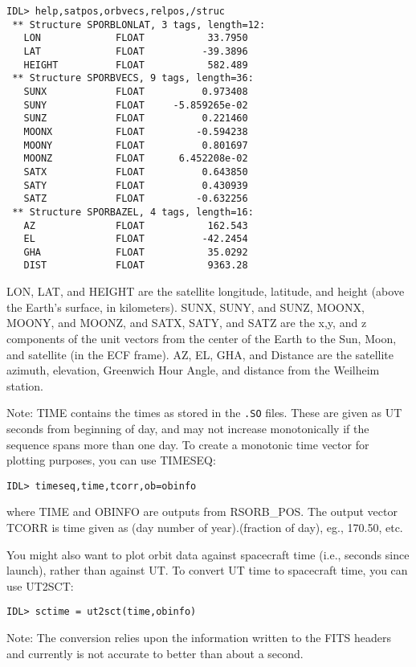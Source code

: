 \medskip\noindent
\begin{verbatim}
IDL> help,satpos,orbvecs,relpos,/struc
 ** Structure SPORBLONLAT, 3 tags, length=12:
   LON             FLOAT           33.7950
   LAT             FLOAT          -39.3896
   HEIGHT          FLOAT           582.489
 ** Structure SPORBVECS, 9 tags, length=36:
   SUNX            FLOAT          0.973408
   SUNY            FLOAT     -5.859265e-02
   SUNZ            FLOAT          0.221460
   MOONX           FLOAT         -0.594238
   MOONY           FLOAT          0.801697
   MOONZ           FLOAT      6.452208e-02
   SATX            FLOAT          0.643850
   SATY            FLOAT          0.430939
   SATZ            FLOAT         -0.632256
 ** Structure SPORBAZEL, 4 tags, length=16:
   AZ              FLOAT           162.543
   EL              FLOAT          -42.2454
   GHA             FLOAT           35.0292
   DIST            FLOAT           9363.28
\end{verbatim}
LON, LAT, and HEIGHT are the satellite longitude, latitude, and height (above
the Earth's surface, in kilometers). SUNX, SUNY, and SUNZ, MOONX, MOONY, and
MOONZ, and SATX, SATY, and SATZ are the x,y, and z components of the unit
vectors from the center of the Earth to the Sun, Moon, and satellite (in the
ECF frame). AZ, EL, GHA, and Distance are the satellite azimuth, elevation,
Greenwich Hour Angle, and distance from the Weilheim station.
 
Note: TIME contains the times as stored in the {\tt .SO} files. These are given as
UT seconds from beginning of day, and may not increase monotonically if the
sequence spans more than one day. To create a monotonic time vector for
plotting purposes, you can use TIMESEQ:

\medskip\noindent
\begin{verbatim}
IDL> timeseq,time,tcorr,ob=obinfo
\end{verbatim}
where TIME and OBINFO are outputs from RSORB{\_}POS. The output vector TCORR is
time given as (day number of year).(fraction of day), eg., 170.50, etc.
 
You might also want to plot orbit data against spacecraft time (i.e., seconds
since launch), rather than against UT. To convert UT time to spacecraft time,
you can use UT2SCT:

\medskip\noindent
\begin{verbatim}
IDL> sctime = ut2sct(time,obinfo)
\end{verbatim}
Note: The conversion relies upon the information written to the FITS
headers and currently is not accurate to better than about a second.
 
